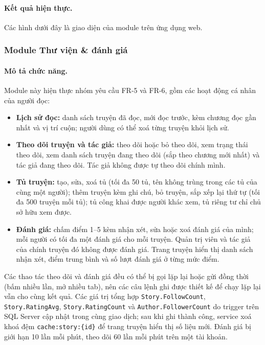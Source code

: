 \paragraph{Kết quả hiện thực.} Các hình dưới đây là giao diện của module trên ứng dụng web.


\subsubsection{Module Thư viện \& đánh giá}
\label{subsubsec:feature-library}

\paragraph{Mô tả chức năng.} Module này hiện thực nhóm yêu cầu FR-5 và FR-6, gồm các hoạt động cá nhân của người đọc:
\begin{itemize}
    \item \textbf{Lịch sử đọc:} danh sách truyện đã đọc, mới đọc trước, kèm chương đọc gần nhất và vị trí cuộn; người dùng có thể xoá từng truyện khỏi lịch sử.
    \item \textbf{Theo dõi truyện và tác giả:} theo dõi hoặc bỏ theo dõi, xem trạng thái theo dõi, xem danh sách truyện đang theo dõi (sắp theo chương mới nhất) và tác giả đang theo dõi. Tác giả không được tự theo dõi chính mình.
    \item \textbf{Tủ truyện:} tạo, sửa, xoá tủ (tối đa 50 tủ, tên không trùng trong các tủ của cùng một người); thêm truyện kèm ghi chú, bỏ truyện, sắp xếp lại thứ tự (tối đa 500 truyện mỗi tủ); tủ công khai được người khác xem, tủ riêng tư chỉ chủ sở hữu xem được.
    \item \textbf{Đánh giá:} chấm điểm 1--5 kèm nhận xét, sửa hoặc xoá đánh giá của mình; mỗi người có tối đa một đánh giá cho mỗi truyện. Quản trị viên và tác giả của chính truyện đó không được đánh giá. Trang truyện hiển thị danh sách nhận xét, điểm trung bình và số lượt đánh giá ở từng mức điểm.
\end{itemize}
Các thao tác theo dõi và đánh giá đều có thể bị gọi lặp lại hoặc gửi đồng thời (bấm nhiều lần, mở nhiều tab), nên các câu lệnh ghi được thiết kế để chạy lặp lại vẫn cho cùng kết quả. Các giá trị tổng hợp \texttt{Story.FollowCount}, \texttt{Story.RatingAvg}, \texttt{Story.RatingCount} và \texttt{Author.FollowerCount} do trigger trên SQL Server cập nhật trong cùng giao dịch; sau khi ghi thành công, service xoá khoá đệm \texttt{cache:story:\{id\}} để trang truyện hiển thị số liệu mới. Đánh giá bị giới hạn 10 lần mỗi phút, theo dõi 60 lần mỗi phút trên một tài khoản.

